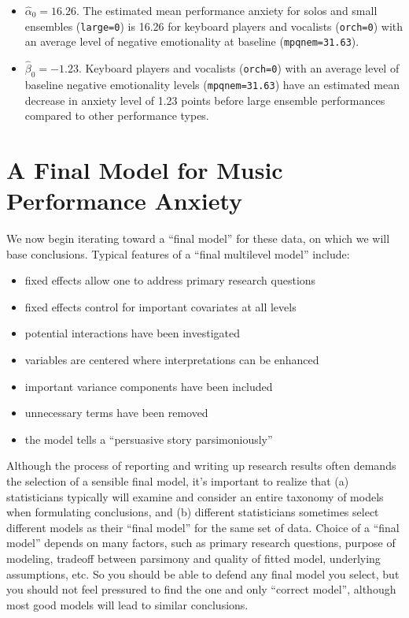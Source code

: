 \documentclass[
]{krantz}
\providecommand{\tightlist}{%
  \setlength{\itemsep}{0pt}\setlength{\parskip}{0pt}}
\begin{document}
\begin{itemize}
\tightlist
\item
  \(\hat{\alpha}_{0} = 16.26\). The estimated mean performance anxiety for solos and small ensembles (\texttt{large=0}) is 16.26 for keyboard players and vocalists (\texttt{orch=0}) with an average level of negative emotionality at baseline (\texttt{mpqnem=31.63}).
\item
  \(\hat{\beta}_{0} = -1.23\). Keyboard players and vocalists (\texttt{orch=0}) with an average level of baseline negative emotionality levels (\texttt{mpqnem=31.63}) have an estimated mean decrease in anxiety level of 1.23 points before large ensemble performances compared to other performance types.
\end{itemize}

\hypertarget{modelf}{%
\section{A Final Model for Music Performance Anxiety}\label{modelf}}

We now begin iterating toward a ``final model'' for these data, on which we will base conclusions. Typical features of a ``final multilevel model''  include:

\begin{itemize}
\tightlist
\item
  fixed effects allow one to address primary research questions
\item
  fixed effects control for important covariates at all levels
\item
  potential interactions have been investigated
\item
  variables are centered where interpretations can be enhanced
\item
  important variance components have been included
\item
  unnecessary terms have been removed
\item
  the model tells a ``persuasive story parsimoniously''
\end{itemize}

Although the process of reporting and writing up research results often demands the selection of a sensible final model, it's important to realize that (a) statisticians typically will examine and consider an entire taxonomy of models when formulating conclusions, and (b) different statisticians sometimes select different models as their ``final model'' for the same set of data. Choice of a ``final model'' depends on many factors, such as primary research questions, purpose of modeling, tradeoff between parsimony and quality of fitted model, underlying assumptions, etc. So you should be able to defend any final model you select, but you should not feel pressured to find the one and only ``correct model'', although most good models will lead to similar conclusions.
\end{document}

